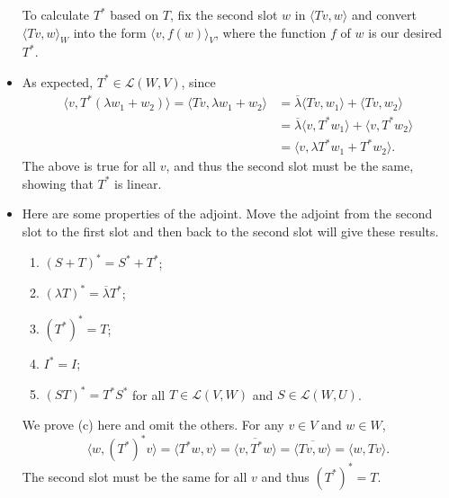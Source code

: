 \documentclass{article}
\newcommand{\conj}[1]{\overline{#1}}
\newcommand{\inp}[2]{\langle #1, #2 \rangle}
\newcommand{\LVW}{\mathcal{L}(V,W)}
\renewcommand{\phi}{\varphi}
\begin{document}
\begin{itemize}
    To calculate $T^*$ based on $T$, fix the second slot $w$ in $\inp{Tv}{w}$ and convert $\inp{Tv}{w}_W$ into the form $\inp{v}{f(w)}_V$, where the function $f$ of $w$ is our desired $T^*$.
    \item As expected, $T^* \in \mathcal{L}(W,V)$, since
    \begin{align*}
        \inp{v}{T^*(\lambda w_1 + w_2)} = \inp{Tv}{\lambda w_1 + w_2} & = \conj{\lambda}\inp{Tv}{w_1} + \inp{Tv}{w_2} \\ & = \conj{\lambda}\inp{v}{T^*w_1} + \inp{v}{T^*w_2} \\ & = \inp{v}{\lambda T^* w_1 + T^*w_2}.
    \end{align*}
    The above is true for all $v$, and thus the second slot must be the same, showing that $T^*$ is linear.
    \item Here are some properties of the adjoint. Move the adjoint from the second slot to the first slot and then back to the second slot will give these results.
    \begin{enumerate}[label=(\alph*)]
        \item $(S+T)^* = S^* + T^*$;
        \item $(\lambda T)^* = \conj{\lambda}T^*$;
        \item $(T^*)^* = T$;
        \item $I^* = I$;
        \item $(ST)^* = T^*S^*$ for all $T \in \LVW$ and $S \in \mathcal{L}(W,U)$.
    \end{enumerate}
    We prove (c) here and omit the others. For any $v \in V$ and $w \in W$, $$\inp{w}{(T^*)^*v} = \inp{T^*w}{v} = \conj{\inp{v}{T^*w}} = \conj{\inp{Tv}{w}} = \inp{w}{Tv}.$$ The second slot must be the same for all $v$ and thus $(T^*)^*=T$.
    

\end{itemize}
\end{document}
